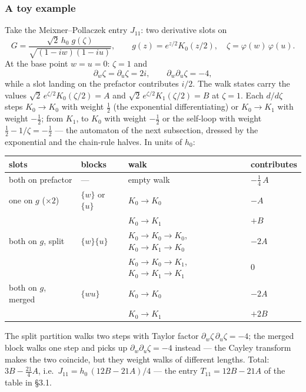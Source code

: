 \documentclass[11pt,a4paper]{article}
\theoremstyle{definition}
\begin{document}
\begin{tcolorbox}[breakable, colback=yellow!10, colframe=yellow!10, boxrule=0pt, sharp corners]
\subsubsection*{A toy example}

Take the Meixner--Pollaczek entry $J_{11}$: two derivative slots on
\[
  G = \frac{\sqrt2\, h_0\; g(\zeta)}{\sqrt{(1-iw)(1-iu)}},
  \qquad g(z) = e^{z/2} K_0(z/2), \quad
  \zeta = \varphi(w)\,\varphi(u).
\]
At the base point $w = u = 0$: $\zeta = 1$ and
\[
  \partial_w \zeta = \partial_u \zeta = 2i, \qquad
  \partial_w \partial_u \zeta = -4,
\]
while a slot landing on the prefactor contributes $i/2$. The walk
states carry the values $\sqrt2\, e^{\zeta/2} K_0(\zeta/2) = A$ and
$\sqrt2\, e^{\zeta/2} K_1(\zeta/2) = B$ at $\zeta = 1$. Each
$d/d\zeta$ steps $K_0 \to K_0$ with weight $\tfrac12$ (the
exponential differentiating) or $K_0 \to K_1$ with weight
$-\tfrac12$; from $K_1$, to $K_0$ with weight $-\tfrac12$ or the
self-loop with weight $\tfrac12 - 1/\zeta = -\tfrac12$ --- the
automaton of the next subsection, dressed by the exponential and
the chain-rule halves. In units of $h_0$:
\begin{center}
\begin{tabular}{llll}
slots & blocks & walk & contributes \\
\hline
both on prefactor & --- & empty walk & $-\tfrac14\, A$ \\
one on $g$ ($\times 2$) & $\{w\}$ or $\{u\}$ & $K_0 \to K_0$ & $-A$ \\
 & & $K_0 \to K_1$ & $+B$ \\
both on $g$, split & $\{w\}\{u\}$ & $K_0 \to K_0 \to K_0$,\; $K_0 \to K_1 \to K_0$ & $-2A$ \\
 & & $K_0 \to K_0 \to K_1$,\; $K_0 \to K_1 \to K_1$ & $0$ \\
both on $g$, merged & $\{wu\}$ & $K_0 \to K_0$ & $-2A$ \\
 & & $K_0 \to K_1$ & $+2B$ \\
\end{tabular}
\end{center}
The split partition walks two steps with Taylor factor
$\partial_w\zeta\,\partial_u\zeta = -4$; the merged block walks one
step and picks up $\partial_w\partial_u\zeta = -4$ instead --- the
Cayley transform makes the two coincide, but they weight walks of
different lengths. Total: $3B - \tfrac{21}{4}A$, i.e.\
$J_{11} = h_0\,(12B - 21A)/4$ --- the entry $T_{11} = 12B - 21A$
of the table in \S3.1.
\end{tcolorbox}
\end{document}
